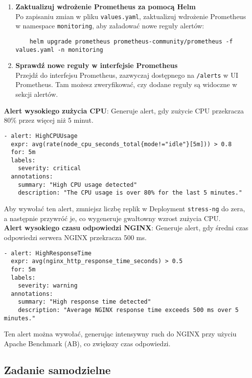 \documentclass{article}
\begin{document}
\begin{enumerate}
    \item \textbf{Zaktualizuj wdrożenie Prometheus za pomocą Helm} \\
    Po zapisaniu zmian w pliku \texttt{values.yaml}, zaktualizuj wdrożenie Prometheus w namespace \texttt{monitoring}, aby załadować nowe reguły alertów:
    \begin{lstlisting}
    helm upgrade prometheus prometheus-community/prometheus -f values.yaml -n monitoring
    \end{lstlisting}

    \item \textbf{Sprawdź nowe reguły w interfejsie Prometheus} \\
    Przejdź do interfejsu Prometheus, zazwyczaj dostępnego na \texttt{/alerts} w UI Prometheus. Tam możesz zweryfikować, czy dodane reguły są widoczne w sekcji alertów.
\end{enumerate}


\textbf{Alert wysokiego zużycia CPU}: Generuje alert, gdy zużycie CPU przekracza 80\% przez więcej niż 5 minut.
\begin{lstlisting}
- alert: HighCPUUsage
  expr: avg(rate(node_cpu_seconds_total{mode!="idle"}[5m])) > 0.8
  for: 5m
  labels:
    severity: critical
  annotations:
    summary: "High CPU usage detected"
    description: "The CPU usage is over 80% for the last 5 minutes."
\end{lstlisting}

Aby wywołać ten alert, zmniejsz liczbę replik w Deployment \texttt{stress-ng} do zera, a następnie przywróć je, co wygeneruje gwałtowny wzrost zużycia CPU.
\\
\textbf{Alert wysokiego czasu odpowiedzi NGINX}: Generuje alert, gdy średni czas odpowiedzi serwera NGINX przekracza 500 ms.
\begin{lstlisting}
- alert: HighResponseTime
  expr: avg(nginx_http_response_time_seconds) > 0.5
  for: 5m
  labels:
    severity: warning
  annotations:
    summary: "High response time detected"
    description: "Average NGINX response time exceeds 500 ms over 5 minutes."
\end{lstlisting}

Ten alert można wywołać, generując intensywny ruch do NGINX przy użyciu Apache Benchmark (AB), co zwiększy czas odpowiedzi.


\subsection{Zadanie samodzielne}
\end{document}
